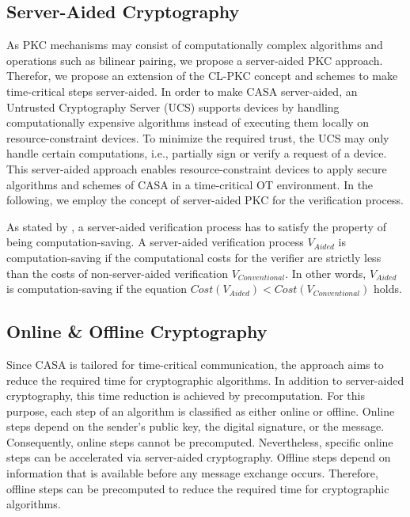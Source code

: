 \subsection{Server-Aided Cryptography}
As PKC mechanisms may consist of computationally complex algorithms and operations such as bilinear pairing, we propose a server-aided PKC approach.
Therefor, we propose an extension of the CL-PKC concept and schemes to make time-critical steps server-aided.
In order to make CASA server-aided, an Untrusted Cryptography Server (UCS) supports devices by handling computationally expensive algorithms instead of executing them locally on resource-constraint devices.
To minimize the required trust, the UCS may only handle certain computations, i.e., partially sign or verify a request of a device.
This server-aided approach enables resource-constraint devices to apply secure algorithms and schemes of CASA in a time-critical OT environment.
In the following, we employ the concept of server-aided PKC for the verification process.

As stated by \citeauthor{Wu2008} \cite{Wu2008}, a server-aided verification process has to satisfy the property of being computation-saving.
A server-aided verification process $V_{Aided}$ is computation-saving if the computational costs for the verifier are strictly less than the costs of non-server-aided verification $V_{Conventional}$.
In other words, $V_{Aided}$ is computation-saving if the equation $Cost(V_{Aided}) < Cost(V_{Conventional})$ holds.

\subsection{Online \& Offline Cryptography}
Since CASA is tailored for time-critical communication, the approach aims to reduce the required time for cryptographic algorithms.
In addition to server-aided cryptography, this time reduction is achieved by precomputation.
For this purpose, each step of an algorithm is classified as either online or offline.
Online steps depend on the sender's public key, the digital signature, or the message.
Consequently, online steps cannot be precomputed.
Nevertheless, specific online steps can be accelerated via server-aided cryptography.
Offline steps depend on information that is available before any message exchange occurs.
Therefore, offline steps can be precomputed to reduce the required time for cryptographic algorithms.

